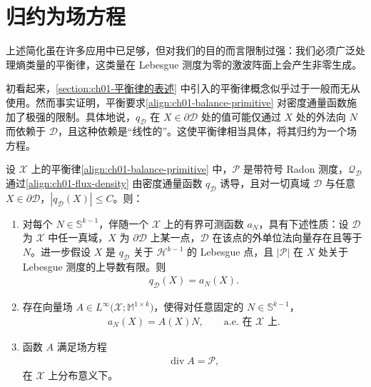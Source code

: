 \documentclass[../../main.tex]{subfiles}
\begin{document}
\section{归约为场方程}\label{section:ch01-归约为场方程}

上述简化虽在许多应用中已足够，但对我们的目的而言限制过强：我们必须广泛处理熵类量的平衡律，这类量在 Lebesgue 测度为零的激波阵面上会产生非零生成。

初看起来，\cref{section:ch01-平衡律的表述} 中引入的平衡律概念似乎过于一般而无从使用。然而事实证明，平衡要求\cref{align:ch01-balance-primitive} 对密度通量函数施加了极强的限制。具体地说，$q_{\mathscr{D}}$ 在 $X\in\partial\mathscr{D}$ 处的值可能仅通过 $X$ 处的外法向 $N$ 而依赖于 $\mathscr{D}$，且这种依赖是“线性的”。这使平衡律相当具体，将其归约为一个场方程。

\begin{theorem}\label{theorem:ch01-场方程归约}
设 $\mathscr{X}$ 上的平衡律\cref{align:ch01-balance-primitive} 中，$\mathscr{P}$ 是带符号 Radon 测度，$\mathscr{Q}_{\mathscr{D}}$ 通过\cref{align:ch01-flux-density} 由密度通量函数 $q_{\mathscr{D}}$ 诱导，且对一切真域 $\mathscr{D}$ 与任意 $X\in\partial\mathscr{D}$，$|q_{\mathscr{D}}(X)|\leqslant C$。则：
\begin{enumerate}
\item\label{item:ch01-场方程归约-i} 对每个 $N\in\mathbb{S}^{k-1}$，伴随一个 $\mathscr{X}$ 上的有界可测函数 $a_{N}$，具有下述性质：设 $\mathscr{D}$ 为 $\mathscr{X}$ 中任一真域，$X$ 为 $\partial\mathscr{D}$ 上某一点，$\mathscr{D}$ 在该点的外单位法向量存在且等于 $N$。进一步假设 $X$ 是 $q_{\mathscr{D}}$ 关于 $\mathscr{H}^{k-1}$ 的 Lebesgue 点，且 $|\mathscr{P}|$ 在 $X$ 处关于 Lebesgue 测度的上导数有限。则
\begin{align}
q_{\mathscr{D}}(X)=a_{N}(X).\label{align:ch01-qd-aN}
\end{align}
\item\label{item:ch01-场方程归约-ii} 存在向量场 $A\in L^{\infty}\bigl(\mathscr{X};\mathbb{M}^{1\times k}\bigr)$，使得对任意固定的 $N\in\mathbb{S}^{k-1}$，
\begin{align}
a_{N}(X)=A(X)N,\qquad\text{a.e. 在 }\mathscr{X}\text{ 上}.\label{align:ch01-aN-AN}
\end{align}
\item\label{item:ch01-场方程归约-iii} 函数 $A$ 满足场方程
\begin{align}
\operatorname{div} A=\mathscr{P},\label{align:ch01-divA-P}
\end{align}
在 $\mathscr{X}$ 上分布意义下。
\end{enumerate}
\end{theorem}
\end{document}
